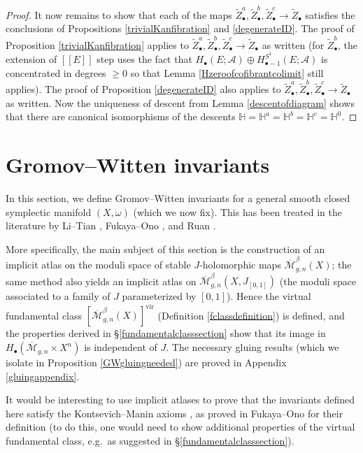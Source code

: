 \documentclass[12pt]{article}
\theoremstyle{definition}
\theoremstyle{remark}
\numberwithin{equation}{subsection}
\newcommand{\HH}{\mathbb H}
\newcommand{\A}{\mathcal A}
\newcommand{\Mbar}{\overline{\mathcal M}}
\newcommand{\vir}{\mathrm{vir}}
\begin{document}
\begin{proof}
It now remains to show that each of the maps $\tilde Z_\bullet^a,\tilde Z_\bullet^b,\tilde Z_\bullet^c\to\tilde Z_\bullet$ satisfies the conclusions of Propositions \ref{trivialKanfibration} and \ref{degenerateID}.  The proof of Proposition \ref{trivialKanfibration} applies to $\tilde Z_\bullet^a,\tilde Z_\bullet^b,\tilde Z_\bullet^c\to\tilde Z_\bullet$ as written (for $\tilde Z_\bullet^b$, the extension of $[[E]]$ step uses the fact that $H_\bullet(E;\A)\oplus H_{\bullet-1}^{S^1}(E;\A)$ is concentrated in degrees $\geq 0$ so that Lemma \ref{Hzeroofcofibrantcolimit} still applies).  The proof of Proposition \ref{degenerateID} also applies to $\tilde Z_\bullet^a,\tilde Z_\bullet^b,\tilde Z_\bullet^c\to\tilde Z_\bullet$ as written.  Now the uniqueness of descent from Lemma \ref{descentofdiagram} shows that there are canonical isomorphisms of the descents $\HH=\HH^a=\HH^b=\HH^c=\HH^0$.
\end{proof}

\section{Gromov--Witten invariants}\label{gromovwittensection}

In this section, we define Gromov--Witten invariants for a general smooth closed symplectic manifold $(X,\omega)$ (which we now fix).  This has been treated in the literature by Li--Tian \cite{litianII}, Fukaya--Ono \cite{fukayaono}, and Ruan \cite{ruan}.

More specifically, the main subject of this section is the construction of an implicit atlas on the moduli space of stable $J$-holomorphic maps $\Mbar_{g,n}^\beta(X)$; the same method also yields an implicit atlas on $\Mbar_{g,n}^\beta(X,J_{[0,1]})$ (the moduli space associated to a family of $J$ parameterized by $[0,1]$).  Hence the virtual fundamental class $[\Mbar_{g,n}^\beta(X)]^\vir$ (Definition \ref{fclassdefinition}) is defined, and the properties derived in \S\ref{fundamentalclasssection} show that its image in $H_\bullet(\Mbar_{g,n}\times X^n)$ is independent of $J$.  The necessary gluing results (which we isolate in Proposition \ref{GWgluingneeded}) are proved in Appendix \ref{gluingappendix}.

It would be interesting to use implicit atlases to prove that the invariants defined here satisfy the Kontsevich--Manin axioms \cite{kontsevichmanin}, as proved in Fukaya--Ono \cite{fukayaono} for their definition (to do this, one would need to show additional properties of the virtual fundamental class, e.g.\ as suggested in \S\ref{fundamentalclasssection}).
\end{document}
